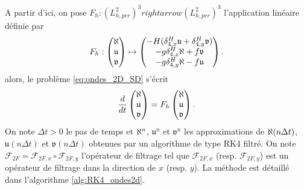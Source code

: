 A partir d'ici, on pose $F_h : (L_{h,per}^2)^3 rightarrow (L_{h,per}^2)^3$ l'application linéaire définie par
\begin{equation}
F_h : \begin{pmatrix}
\aleph \\ \mathfrak{u} \\ \mathfrak{v}
\end{pmatrix} \mapsto \begin{pmatrix}
- H (\delta_{4,x}^H \mathfrak{u} + \delta_{4,y}^H \mathfrak{v}) \\
- g \delta_{4,x}^H \aleph + f \mathfrak{v} \\
- g \delta_{4,y}^H \aleph - f \mathfrak{u}
\end{pmatrix}.
\end{equation}
alors, le problème \eqref{eq:ondes_2D_SD} s'écrit
\begin{equation}
\dfrac{d}{dt} \begin{pmatrix}
\aleph \\ \mathfrak{u} \\ \mathfrak{v}
\end{pmatrix} = F_h\begin{pmatrix}
\aleph \\ \mathfrak{u} \\ \mathfrak{v}
\end{pmatrix}.
\end{equation}
On note $\Delta t>0$ le pas de temps et $\aleph^n$, $\mathfrak{u}^n$ et $\mathfrak{v}^n$ les approximations de $\aleph(n\Delta t)$, $\mathfrak{u}(n \Delta t)$ et $\mathfrak{v}(n \Delta t)$ obtenues par un algorithme de type RK4 filtré. On note $\mathcal{F}_{2F} = \mathcal{F}_{2F,x} \circ \mathcal{F}_{2F,y}$ l'opérateur de filtrage tel que $\mathcal{F}_{2F,x}$ (resp. $\mathcal{F}_{2F,y}$) est un opérateur de filtrage dans la direction de $x$ (resp. $y$). La méthode est détaillé dans l'algorithme \ref{alg:RK4_ondes2d}.


